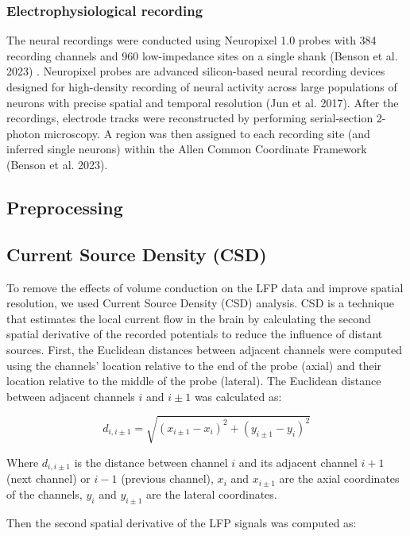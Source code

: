 \documentclass[
  letterpaper,
  DIV=11,
  numbers=noendperiod]{scrartcl}
\begin{document}
\subsubsection{Electrophysiological
recording}\label{electrophysiological-recording}

The neural recordings were conducted using Neuropixel 1.0 probes with
384 recording channels and 960 low-impedance sites on a single shank
(Benson et al. 2023) . Neuropixel probes are advanced silicon-based
neural recording devices designed for high-density recording of neural
activity across large populations of neurons with precise spatial and
temporal resolution (Jun et al. 2017). After the recordings, electrode
tracks were reconstructed by performing serial-section 2-photon
microscopy. A region was then assigned to each recording site (and
inferred single neurons) within the Allen Common Coordinate Framework
(Benson et al. 2023).

\subsection{Preprocessing}\label{preprocessing}

\subsection{Current Source Density
(CSD)}\label{current-source-density-csd}

To remove the effects of volume conduction on the LFP data and improve
spatial resolution, we used Current Source Density (CSD) analysis. CSD
is a technique that estimates the local current flow in the brain by
calculating the second spatial derivative of the recorded potentials to
reduce the influence of distant sources. First, the Euclidean distances
between adjacent channels were computed using the channels' location
relative to the end of the probe (axial) and their location relative to
the middle of the probe (lateral). The Euclidean distance between
adjacent channels \(i\) and \(i \pm 1\) was calculated as:

\[
d_{i,i \pm 1} = \sqrt{(x_{i \pm 1} - x_i)^2 + (y_{i \pm 1} - y_i)^2}
\]

Where \(d_{i,i \pm 1}\) is the distance between channel \(i\) and its
adjacent channel \(i+1\) (next channel) or \(i-1\) (previous channel),
\(x_i\) and \(x_{i \pm 1}\) are the axial coordinates of the channels,
\(y_i\) and \(y_{i \pm 1}\) are the lateral coordinates.

Then the second spatial derivative of the LFP signals was computed as:
\end{document}
